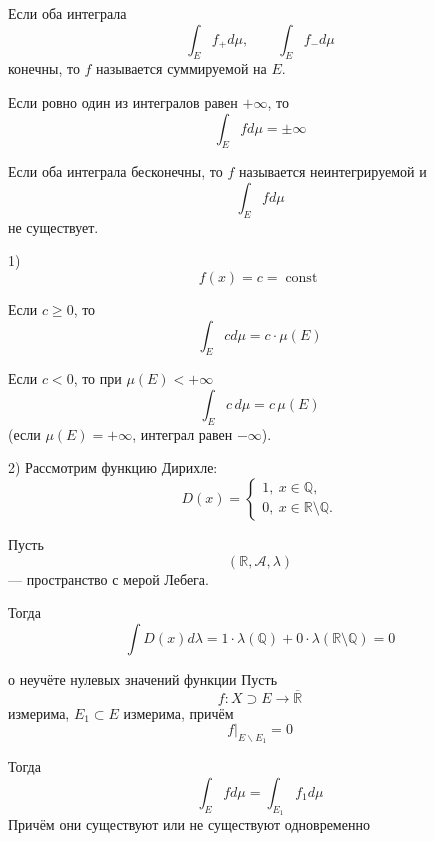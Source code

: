 \documentclass[12pt,a4paper]{article}
\begin{document}
\begin{note}
    Если оба интеграла
    \[
        \int_E f_+ d\mu,\qquad
        \int_E f_- d\mu
    \]
    конечны, то $f$ называется суммируемой на $E$.

    Если ровно один из интегралов равен $+\infty$, то
    \[
        \int_E f d\mu=\pm\infty
    \]

    Если оба интеграла бесконечны, то $f$ называется неинтегрируемой и
    \[
        \int_E f d\mu
    \]
    не существует.
\end{note}

\begin{example}
    1) \[
        f(x)=c=\operatorname{const}
    \]

    Если $c\geq0$, то
    \[
        \int_E c d\mu
        =
        c\cdot\mu(E)
    \]

    Если $c<0$, то при $\mu(E)<+\infty$
    \[
        \int_E c\,d\mu=c\,\mu(E)
    \]
    (если $\mu(E)=+\infty$, интеграл равен $-\infty$).

\bigskip

    2) Рассмотрим функцию Дирихле:
    \[
        D(x)=
        \begin{cases}
            1,\ x\in\mathbb{Q},\\
            0,\ x\in\mathbb{R}\setminus\mathbb{Q}.
        \end{cases}
    \]

    Пусть
    \[
        (\mathbb{R},\mathcal{A},\lambda)
    \]
    — пространство с мерой Лебега.

    Тогда
    \[
        \int D(x) d\lambda
        =
        1\cdot\lambda(\mathbb{Q})
        +
        0\cdot\lambda(\mathbb{R}\setminus\mathbb{Q})
        =0
    \]
\end{example}

\begin{lemma}{о неучёте нулевых значений функции}
    Пусть
    \[
        f:X\supset E\to\overline{\mathbb{R}}
    \]
    измерима, $E_1\subset E$ измерима, причём
    \[
        f|_{E\backslash E_1}=0
    \]

    Тогда
    \[
        \int_{E}f d\mu=\int_{E_1}f_1d\mu
    \]
    Причём они существуют или не существуют одновременно
\end{lemma}
\end{document}
